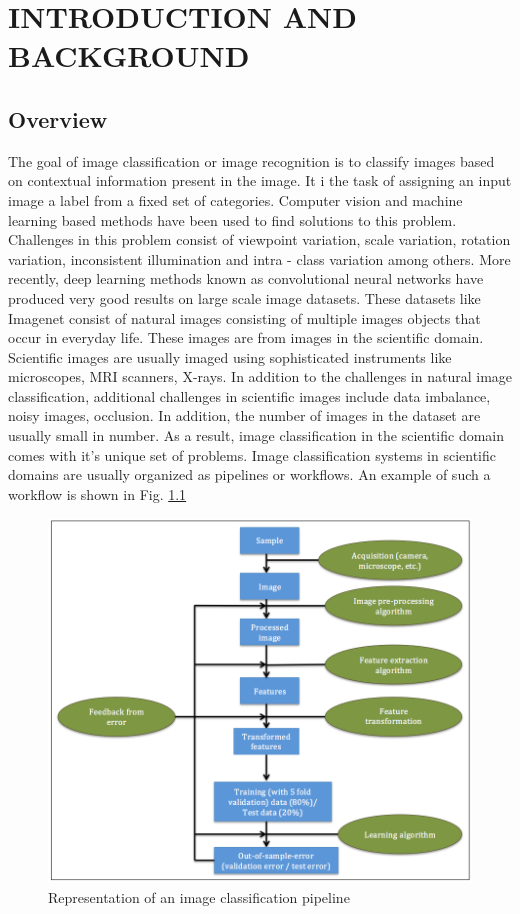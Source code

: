\chapter{INTRODUCTION AND BACKGROUND}
\label{chap:intro}

\section{Overview}
The goal of image classification or image recognition is to classify images based on contextual information present in the image. It i the task of assigning an input image a label from a fixed set of categories. Computer vision and machine learning based methods have been used to find solutions to this problem. Challenges in this problem consist of viewpoint variation, scale variation, rotation variation, inconsistent illumination and intra - class variation among others. More recently, deep learning methods known as convolutional neural networks have produced very good results on large scale image datasets. These datasets like Imagenet \cite{deng2009imagenet} consist of natural images consisting of multiple images objects that occur in everyday life. These images are from images in the scientific domain. Scientific images are usually imaged using sophisticated instruments like microscopes, MRI scanners, X-rays. In addition to the challenges in natural image classification, additional challenges in scientific images include data imbalance, noisy images, occlusion. In addition, the number of images in the dataset are usually small in number. As a result, image classification in the scientific domain comes with it's unique set of problems. 
Image classification systems in scientific domains are usually organized as pipelines or workflows. An example of such a workflow is shown in Fig.  \ref{fig:flowchart1}

\begin{figure}[ht!]
    \centering
    \includegraphics[scale=0.5]{img/EP/flowchart}
    \caption{Representation of an image classification pipeline}
\label{fig:flowchart1}
\end{figure}

